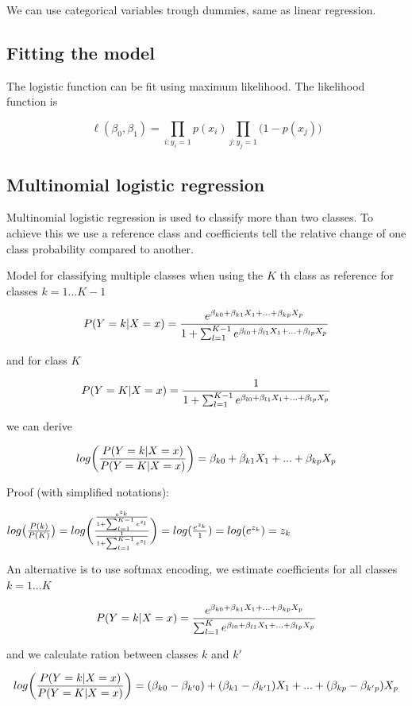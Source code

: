 We can use categorical variables trough dummies, same as linear regression.

\subsection{Fitting the model}

The logistic function can be fit using maximum likelihood. The likelihood function is

\[\ell(\beta_0, \beta_1) = \prod_{i:y_i=1}p(x_i)\prod_{j:y_j=1}\big (1 - p(x_j)\big )\]

\subsection{Multinomial logistic regression}

Multinomial logistic regression is used to classify more than two classes. To achieve this we use a reference class and coefficients tell the relative change of one class probability compared to another.

Model for classifying multiple classes when using the \(K\) th class as reference for classes \(k = 1...K-1\)

\[P(Y=k|X=x) = {e^{\beta_{k0} + \beta_{k1}X_1 + ... + \beta_{kp}X_p} \over 1 + \sum_{l=1}^{K-1}e^{\beta_{l0} + \beta_{l1}X_1 + ... + \beta_{lp}X_p}}\]

and for class \(K\)

\[P(Y=K|X=x) = {1 \over 1 + \sum_{l=1}^{K-1}e^{\beta_{l0} + \beta_{l1}X_1 + ... + \beta_{lp}X_p}}\]

we can derive

\[log\bigg({P(Y=k|X=x) \over P(Y=K|X=x)}\bigg)=\beta_{k0} + \beta_{k1}X_1 + ... + \beta_{kp}X_p\]

Proof (with simplified notations):

\(log\big({P(k) \over P(K)}\big) = log\bigg({{e^{z_k} \over 1 + \sum_{l=1}^{K-1}e^{z_l}} \over {1 \over 1 + \sum_{l=1}^{K-1}e^{z_l}}}\bigg) = log({e^{z_k} \over 1}) = log(e^{z_k}) = z_k\)

An alternative is to use softmax encoding, we estimate coefficients for all classes \(k = 1...K\)

\[P(Y=k|X=x) = {e^{\beta_{k0} + \beta_{k1}X_1 + ... + \beta_{kp}X_p} \over \sum_{l=1}^K e^{\beta_{l0} + \beta_{l1}X_1 + ... + \beta_{lp}X_p}}\]

and we calculate ration between classes \(k\) and \(k'\)

\[log\bigg({P(Y=k|X=x) \over P(Y=K|X=x)}\bigg)=(\beta_{k0}-\beta_{k'0}) + (\beta_{k1}-\beta_{k'1})X_1 + ... + (\beta_{kp}-\beta_{k'p})X_p\]

